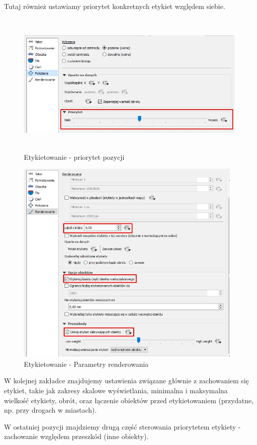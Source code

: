 \documentclass[12pt,a4paper]{book}
\begin{document}
Tutaj również ustawiamy priorytet konkretnych etykiet względem siebie.
\begin{figure}[ht]
	\centering
	\includegraphics[height=7cm]{007-etykiety-priorytet.jpg}
	\caption{Etykietowanie - priorytet pozycji}
\end{figure}
\begin{figure}[ht]
	\centering
	\includegraphics[height=10cm]{007-etykiety-render.png}
	\caption{Etykietowanie - Parametry renderowania}
\end{figure}

W kolejnej zakładce znajdujemy ustawienia związane głównie z zachowaniem się etykiet, takie jak zakresy skalowe wyświetlania, minimalna i maksymalna wielkość etykiety, obrót, oraz łączenie obiektów przed etykietowaniem (przydatne, np. przy drogach w miastach).

W ostatniej pozycji znajdziemy drugą część sterowania priorytetem etykiety - zachowanie względem przeszkód (inne obiekty).
\end{document}

